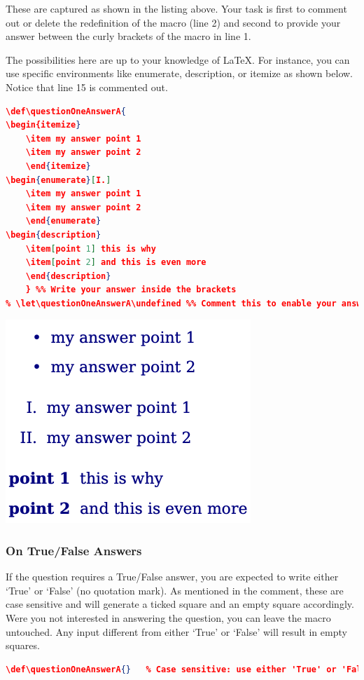 These are captured as shown in the listing above.  Your task is first to comment out or delete the redefinition of the macro (line 2) and second to provide your answer between the curly brackets of the macro in line 1.  

The possibilities here are up to your knowledge of \LaTeX.  For instance, you can use specific environments like enumerate, description, or itemize as shown below.  Notice that line 15 is commented out.
\begin{lstlisting}[language=json,basicstyle=\ttfamily\footnotesize,numbersep=5pt,frame=trBL,framexleftmargin=1.5em]
\def\questionOneAnswerA{
\begin{itemize}
	\item my answer point 1
	\item my answer point 2
	\end{itemize}
\begin{enumerate}[I.]
	\item my answer point 1
	\item my answer point 2
	\end{enumerate}
\begin{description}
	\item[point 1] this is why
	\item[point 2] and this is even more
	\end{description}
	} %% Write your answer inside the brackets
% \let\questionOneAnswerA\undefined %% Comment this to enable your answer
\end{lstlisting}
\begin{center}
	\includegraphics[width=.4\columnwidth]{img/example1}
\end{center}



\subsubsection*{On True/False Answers}
If the question requires a True/False answer, you are expected to write either `True' or `False' (no quotation mark).  As mentioned in the comment, these are case sensitive and will generate a ticked square and an empty square accordingly.  Were you not interested in answering the question, you can leave the macro untouched.  Any input different from either `True' or `False' will result in empty squares.
\begin{lstlisting}[language=json,basicstyle=\ttfamily\footnotesize,numbersep=5pt,frame=trBL,framexleftmargin=1.5em]
\def\questionOneAnswerA{}	% Case sensitive: use either 'True' or 'False'
\end{lstlisting}



